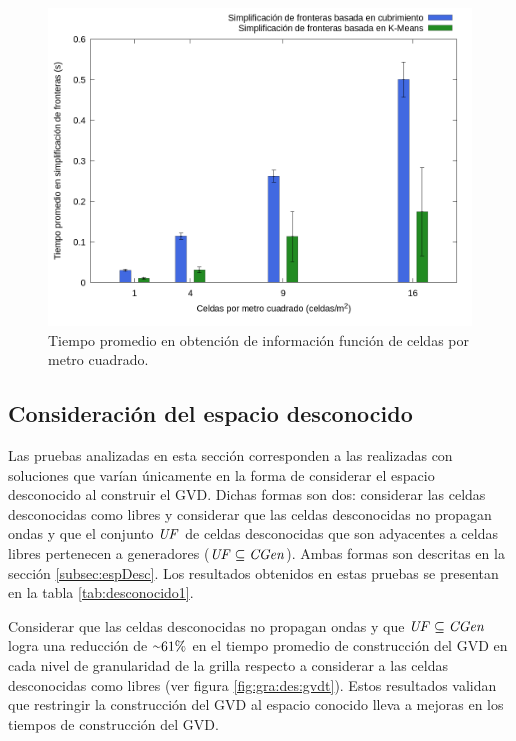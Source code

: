 \begin{figure}[H]
  \centerfloat
  \includegraphics[clip=true, width=\graphlen]{imagenes/graficas_chicas/graficas_histo_num/ident_obj/obj_id_time_mean.png}
  \caption{Tiempo promedio en obtención de información función de celdas por metro cuadrado.}\label{fig:gra:idobj:iobt}
\end{figure}

\subsection{Consideración del espacio desconocido}\label{sec:exp:desco}

Las pruebas analizadas en esta sección corresponden a las realizadas con
soluciones que varían únicamente en la forma de considerar el espacio
desconocido al construir el GVD. Dichas formas son dos: considerar las
celdas desconocidas como libres y considerar que las celdas desconocidas no
propagan ondas y que el conjunto $\mathit{UF}$ de celdas desconocidas que son
adyacentes a celdas libres pertenecen a generadores ($\mathit{UF} \subseteq
\mathit{CGen}$). Ambas formas son descritas en la sección \ref{subsec:espDesc}. Los
resultados obtenidos en estas pruebas se presentan en la tabla \ref{tab:desconocido1}.



Considerar que las celdas desconocidas no propagan ondas y que $\mathit{UF}
\subseteq \mathit{CGen}$ logra una reducción de ${\smallsim}61\%$ en el tiempo
promedio de construcción del GVD en cada nivel de granularidad de la grilla respecto a
considerar a las celdas desconocidas como libres (ver figura \ref{fig:gra:des:gvdt}). Estos resultados validan que
restringir la construcción del GVD al espacio conocido lleva a mejoras en los
tiempos de construcción del GVD. 

